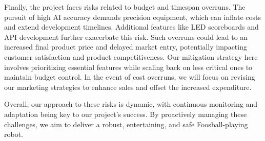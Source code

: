 \documentclass{article}
\begin{document}
Finally, the project faces risks related to budget and timespan overruns. The pursuit of high AI accuracy demands precision equipment, which can inflate costs and extend development timelines. Additional features like LED scoreboards and API development further exacerbate this risk. Such overruns could lead to an increased final product price and delayed market entry, potentially impacting customer satisfaction and product competitiveness. Our mitigation strategy here involves prioritizing essential features while scaling back on less critical ones to maintain budget control. In the event of cost overruns, we will focus on revising our marketing strategies to enhance sales and offset the increased expenditure.

Overall, our approach to these risks is dynamic, with continuous monitoring and adaptation being key to our project's success. By proactively managing these challenges, we aim to deliver a robust, entertaining, and safe Foosball-playing robot.


\end{document}
